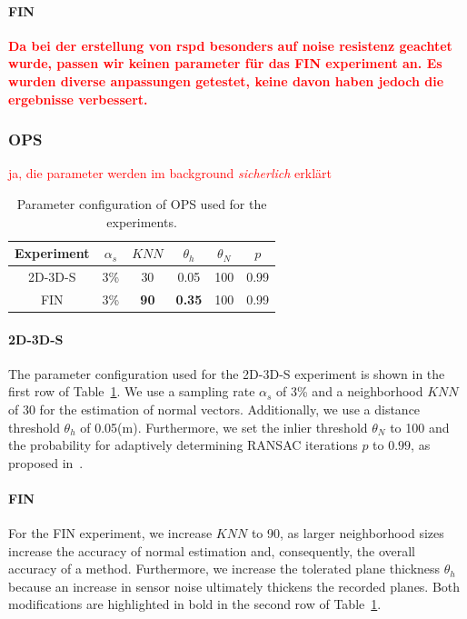 \documentclass[main.tex]{subfiles}
\begin{document}
\paragraph{FIN}
\textbf{\textcolor{red}{Da bei der erstellung von rspd besonders auf noise resistenz geachtet wurde, passen wir keinen parameter für
        das FIN experiment an.
        Es wurden diverse anpassungen getestet, keine davon haben jedoch die ergebnisse verbessert.}}
\subsubsection{OPS}

\textcolor{red}{ja, die parameter werden im background \textit{sicherlich} erklärt}
\begin{table}[H]
    \centering
    \begin{tabular}{c|ccccc}
        Experiment & $\alpha_s$ & $KNN$       & $\theta_{h}$  & $\theta_{N}$ & $p$  \\ \hline
        2D-3D-S    & 3\%        & 30          & 0.05          & 100          & 0.99 \\
        FIN        & 3\%        & \textbf{90} & \textbf{0.35} & 100          & 0.99
    \end{tabular}%
    \caption{Parameter configuration of OPS used for the experiments.}
    \label{tab:ops-param}
\end{table}

\paragraph{2D-3D-S}
The parameter configuration used for the 2D-3D-S experiment is shown in the first row of Table~\ref{tab:ops-param}.
We use a sampling rate $\alpha_s$ of 3\% and a neighborhood $KNN$ of 30 for the estimation of normal vectors.
Additionally, we use a distance threshold $\theta_h$ of 0.05(m).
Furthermore, we set the inlier threshold $\theta_N$ to 100 and the probability for adaptively determining RANSAC iterations
$p$ to $0.99$, as proposed in~\cite[Section~4A]{Sun_Mordohai_2019}.

\paragraph{FIN}
For the FIN experiment, we increase $KNN$ to 90, as larger neighborhood sizes increase the accuracy of normal estimation and,
consequently, the overall accuracy of a method.
Furthermore, we increase the tolerated plane thickness $\theta_h$ because an increase in sensor noise ultimately thickens the recorded planes.
Both modifications are highlighted in bold in the second row of Table~\ref{tab:ops-param}.
\end{document}
